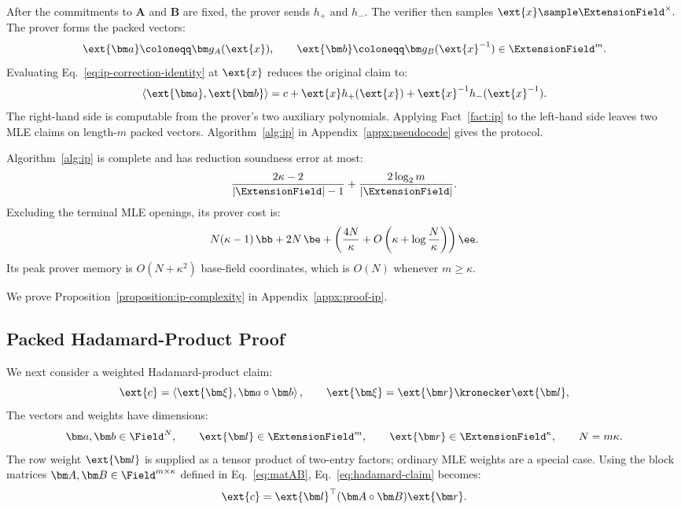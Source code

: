After the commitments to \(\bm A\) and \(\bm B\) are fixed, the
prover sends \(h_+\) and \(h_-\). The verifier then samples
\(
    \ext{x}\sample\ExtensionField^\times.
\)
The prover forms the packed vectors:
\[
    \ext{\bm a}
    \coloneqq
    \bm g_A(\ext{x}),
    \qquad
    \ext{\bm b}
    \coloneqq
    \bm g_B(\ext{x}^{-1})
    \in\ExtensionField^m.
\]
Evaluating Eq.~\eqref{eq:ip-correction-identity} at \(\ext{x}\)
reduces the original claim to:
\begin{equation}
    \left\langle
        \ext{\bm a},\ext{\bm b}
    \right\rangle
    =
    c
    +\ext{x}h_+(\ext{x})
    +\ext{x}^{-1}h_-(\ext{x}^{-1}).
\label{eq:packed-inner-product-check}
\end{equation}
The right-hand side is computable from the prover's two auxiliary
polynomials. Applying Fact~\ref{fact:ip} to the left-hand side
leaves two MLE claims on length-\(m\) packed vectors.
Algorithm~\ref{alg:ip} in Appendix~\ref{appx:pseudocode} gives
the protocol.

\begin{proposition}
\label{proposition:ip-complexity}
Algorithm~\ref{alg:ip} is complete and has reduction soundness
error at most:
\[
    \frac{2\kappa-2 }{|\ExtensionField|-1} + \frac{2\log_2 m}{|\ExtensionField|}.
\]
Excluding the terminal MLE openings, its prover cost is:
\[
    N(\kappa-1)\,\bb
    +
    2N\,\be
    +
    \left(
        \frac{4N}{\kappa}
        +
        O\left(
            \kappa+\log\frac{N}{\kappa}
        \right)
    \right)\ee.
\]
Its peak prover memory is \(O(N+\kappa^2)\) base-field
coordinates, which is \(O(N)\) whenever \(m\geq\kappa\).
\end{proposition}

We prove Proposition~\ref{proposition:ip-complexity} in
Appendix~\ref{appx:proof-ip}.

\subsection{Packed Hadamard-Product Proof}
\label{sec:hadamard}

We next consider a weighted Hadamard-product claim:
\begin{equation}
    \ext{c}
    =
    \left\langle
        \ext{\bm\xi},
        \bm a\circ\bm b
    \right\rangle,
    \qquad
    \ext{\bm\xi}
    =
    \ext{\bm r}\kronecker\ext{\bm l},
\label{eq:hadamard-claim}
\end{equation}
The vectors and weights have dimensions:
\[
    \bm a,\bm b\in\Field^N,
    \qquad
    \ext{\bm l}\in\ExtensionField^m,
    \qquad
    \ext{\bm r}\in\ExtensionField^\kappa,
    \qquad
    N=m\kappa.
\]
The row weight \(\ext{\bm l}\) is supplied as a tensor product
of two-entry factors; ordinary MLE weights are a special case.
Using the block matrices \(\bm A,\bm B\in\Field^{m\times\kappa}\)
defined in Eq.~\eqref{eq:matAB}, Eq.~\eqref{eq:hadamard-claim}
becomes:
\begin{equation*}
    \ext{c}
    =
    \ext{\bm l}^{\top}
    (\bm A\circ\bm B)
    \ext{\bm r}.
\end{equation*}

